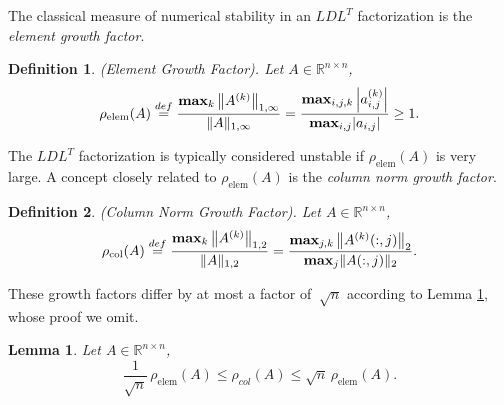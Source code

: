 \documentclass[11pt]{article}
\newtheorem{definition}{Definition}[section]
\newtheorem{lemma}{Lemma}[section]
\begin{document}
The classical measure of numerical stability in an $LDL^T$ factorization is the {\em element growth factor}. 
\begin{definition}\label{De:definition of elment growth factor}
(Element Growth Factor). Let $A \in \mathbb{R}^{n \times n}$,
\[ {\displaystyle 
\rho_{\textrm{elem}}(A) \stackrel{def}{=} \frac{ {\bf max}_k \left\| A^{(k)} \right\|_{1, \infty} }{ \| A \|_{1, \infty } } = \frac{ {\bf max}_{i, j, k} \left| a^{(k)}_{i, j} \right| }{ {\bf max}_{i, j} | a_{i, j } | } \ge 1.} \]
\end{definition}
The $LDL^T$ factorization is typically considered unstable if $\rho_{\textrm{elem}}(A)$ is very large. A concept closely related to $\rho_{\textrm{elem}}(A)$ is the {\em column norm growth factor}. 
\begin{definition}\label{De:definition of column norm growth factor}
(Column Norm Growth Factor). Let $A \in \mathbb{R}^{n \times n}$,
\[ {\displaystyle 
\rho_{\textrm{col}}(A) \stackrel{def}{=} \frac{ {\bf max}_k \left\| A^{(k)} \right\|_{1, 2} }{ \| A \|_{1, 2} } = \frac{ {\bf max}_{j, k} \left\| A^{(k)}(:, j) \right\|_2 }{{\bf max}_{j} \| A(:, j) \|_2}.} \]
\end{definition}
These growth factors differ by at most a factor of $~\sqrt{n}$ according to Lemma \ref{Le:Inequality between element GF and column norm GF}, whose proof we omit. 
\begin{lemma}\label{Le:Inequality between element GF and column norm GF}
Let $A \in \mathbb{R}^{n \times n}$,
$$
\frac{1}{\sqrt{n}} \, \rho_{\textrm{elem}}(A) \le \rho_{col}(A) \le \sqrt{n} \, \rho_{\textrm{elem}}(A).
$$
\end{lemma}
\end{document}
